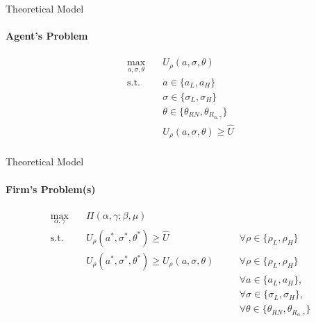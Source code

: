 \documentclass{beamer}
\begin{document}
\begin{frame}{Theoretical Model}
    \framesubtitle{Agent's Problem}

    \begin{equation*}
        \begin{aligned}
        \max_{a, \sigma, \theta} \quad & U_\rho (a, \sigma, \theta) \\
        \textrm{s.t.}       \quad & a \in \{ a_L, a_H \} \\
                            \quad & \sigma \in \{ \sigma_L, \sigma_H \} \\
                            \quad & \theta \in \{\theta_{RN}, \theta_{R_{\alpha, \gamma}} \} \\
                            \quad & U_\rho(a, \sigma, \theta) \ge \hat{U}  \\
        \end{aligned}
    \end{equation*}
\end{frame}

\begin{frame}{Theoretical Model}
    \framesubtitle{Firm's Problem(s)}
    
    \begin{equation*}
        \begin{alignedat}{2}
            \max_{\alpha, \gamma} \quad & \Pi (\alpha, \gamma; \beta, \mu) \\
            \textrm{s.t.}       \quad & U_{\rho}(a^*, \sigma^*, \theta^*) \ge \hat{U} & \quad & \forall \rho \in \{ \rho_L, \rho_H \}\\
                                \quad & U_{\rho}(a^*, \sigma^*, \theta^*) \ge U_{\rho}(a, \sigma, \theta) &\quad& \forall \rho \in \{ \rho_L, \rho_H \}\\
                                \quad & &\quad& \forall a \in \{ a_L, a_H \}, \\
                                \quad & &\quad& \forall \sigma \in \{ \sigma_L, \sigma_H \}, \\
                                \quad & &\quad& \forall \theta \in \{ \theta_{RN}, \theta_{R_{\alpha, \gamma}} \} \\ 
        \end{alignedat}
    \end{equation*}

\end{frame}
\end{document}
